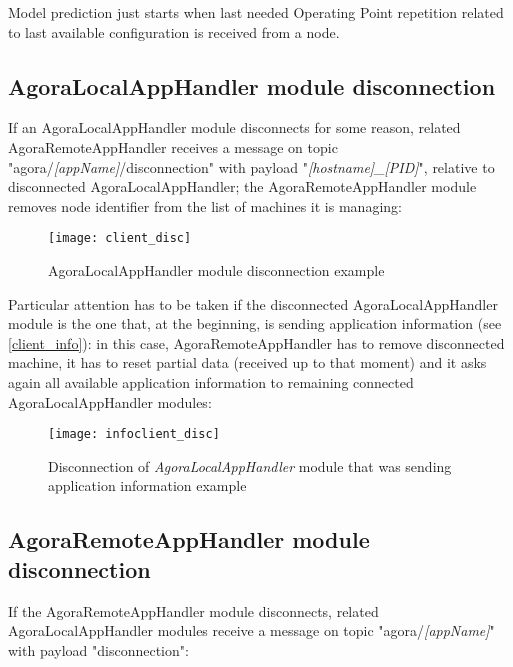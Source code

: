 Model prediction just starts when last needed Operating Point repetition related to last available configuration is received from a node.





\subsection{AgoraLocalAppHandler module disconnection}\label{client_disc}

If an AgoraLocalAppHandler module disconnects for some reason, related Agora\-Remote\-App\-Handler receives a message on topic "agora\slash{}\textit{[appName]}\slash{}dis\-con\-nec\-tion" with payload "\textit{[hostname]\_[PID]}", relative to disconnected AgoraLocalAppHandler; the AgoraRemote\-App\-Handler module removes node identifier from the list of machines it is managing:

\begin{figure}[H]

    \centering
    \texttt{[image: client\_disc]}
    \caption{AgoraLocalAppHandler module disconnection example}
    
\end{figure}

Particular attention has to be taken if the disconnected AgoraLocalAppHandler module is the one that, at the beginning, is sending application information (see \ref{client_info}): in this case, AgoraRemoteAppHandler has to remove disconnected machine, it has to reset partial data (received up to that moment) and it asks again all available application information to remaining connected Agora\-Local\-App\-Handler modules:

\begin{figure}[H]

    \centering
    \texttt{[image: infoclient\_disc]}
    \caption{Disconnection of \textit{AgoraLocalAppHandler} module that was sending application information example}
    
\end{figure}





\subsection{AgoraRemoteAppHandler module disconnection}\label{handler_disc}

If the AgoraRemoteAppHandler module disconnects, related AgoraLocalAppHandler modules receive a message on topic "agora\slash{}\textit{[appName]}" with payload "disconnection":

